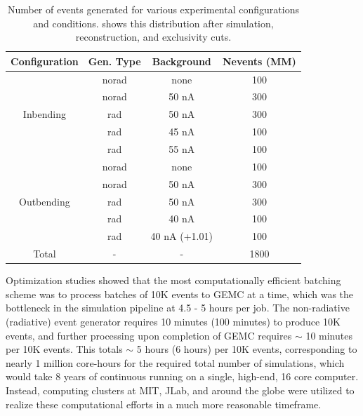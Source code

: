     \fi
    

    \begin{table}[htb]
        \centering
        \begin{tabular}{c|ccc}
            \textbf{Configuration} & \textbf{Gen. Type} & \textbf{Background} & \textbf{Nevents (MM)} \\ \hline
                & norad & none & 100 \\
                & norad & 50 nA & 300 \\
            Inbending & rad & 50 nA & 300 \\
                & rad & 45 nA & 100 \\
                & rad & 55 nA & 100 \\ \hline
                & norad & none & 100 \\
                & norad &  50 nA & 300 \\
            Outbending & rad & 50 nA & 300 \\
                 & rad & 40 nA & 100 \\
             & rad & 40 nA (+1.01) & 100 \\
            \hline
            Total & - & - & 1800 \\
        \end{tabular}
    \caption[Distribution of Generated Events by Configuration]{Number of events generated for various experimental configurations and conditions.  shows this distribution after simulation, reconstruction, and exclusivity cuts.}
    \label{table:Generated_Data}
    \end{table}


    Optimization studies showed that the most computationally efficient batching scheme was to process batches of 10K events to GEMC at a time, which was the bottleneck in the simulation pipeline at 4.5 - 5 hours per job. The non-radiative (radiative) event generator requires 10 minutes (100 minutes) to produce 10K events, and further processing upon completion of GEMC requires $\sim$ 10 minutes per 10K events. This totals $\sim$ 5 hours (6 hours) per 10K events, corresponding to nearly 1 million core-hours for the required total number of simulations, which would take 8 years of continuous running on a single, high-end, 16 core computer. Instead, computing clusters at MIT, JLab, and around the globe were utilized to realize these computational efforts in a much more reasonable timeframe. 
    


